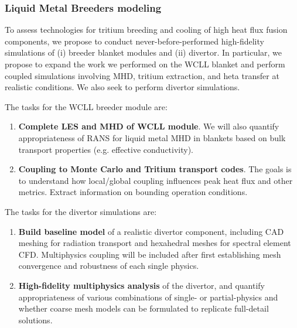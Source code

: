 \subsubsection{Liquid Metal Breeders modeling}

To assess technologies for tritium breeding and cooling of high heat flux fusion components, we propose to conduct
never-before-performed high-fidelity simulations of (i) breeder blanket modules and (ii) divertor. In particular, we propose to expand the work we performed on the WCLL blanket and perform coupled simulations involving MHD, tritium extraction, and heta transfer at realistic conditions. We also seek to perform divertor simulations.  

The tasks for the WCLL breeder module are:

\begin{enumerate}
\item \textbf{Complete LES and MHD of WCLL module}. We will also quantify appropriateness of RANS for liquid metal MHD in blankets based on bulk transport properties (e.g. effective conductivity).
\item\textbf{Coupling to Monte Carlo and Tritium transport codes}. The goals is to understand how local/global coupling influences peak heat flux and other metrics. Extract information on bounding operation conditions.
\end{enumerate}

The tasks for the divertor simulations are:

\begin{enumerate}
\item \textbf{Build baseline model} of a realistic divertor component, including CAD meshing for radiation transport and hexahedral meshes for spectral element CFD. Multiphysics coupling will be included after first establishing mesh convergence and robustness of each single physics.
\item \textbf{High-fidelity multiphysics analysis} of the divertor, and quantify appropriateness of various combinations of single- or partial-physics and whether coarse mesh models can be formulated to replicate full-detail solutions. 
\end{enumerate}


